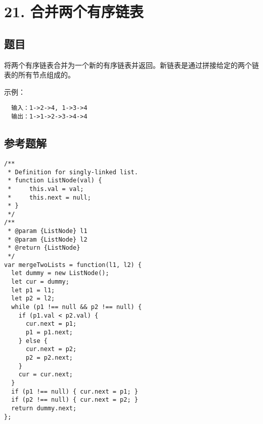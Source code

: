 \newpage
\section{21. 合并两个有序链表}
\label{leetcode:21}

\subsection{题目}

将两个有序链表合并为一个新的有序链表并返回。新链表是通过拼接给定的两个链表的所有节点组成的。 

示例：

\begin{verbatim}
  输入：1->2->4, 1->3->4
  输出：1->1->2->3->4->4
\end{verbatim}

\subsection{参考题解}

\begin{verbatim}
/**
 * Definition for singly-linked list.
 * function ListNode(val) {
 *     this.val = val;
 *     this.next = null;
 * }
 */
/**
 * @param {ListNode} l1
 * @param {ListNode} l2
 * @return {ListNode}
 */
var mergeTwoLists = function(l1, l2) {
  let dummy = new ListNode();
  let cur = dummy;
  let p1 = l1;
  let p2 = l2;
  while (p1 !== null && p2 !== null) {
    if (p1.val < p2.val) {
      cur.next = p1;
      p1 = p1.next;
    } else {
      cur.next = p2;
      p2 = p2.next;
    }
    cur = cur.next;
  }
  if (p1 !== null) { cur.next = p1; }
  if (p2 !== null) { cur.next = p2; }
  return dummy.next;
};
\end{verbatim}
